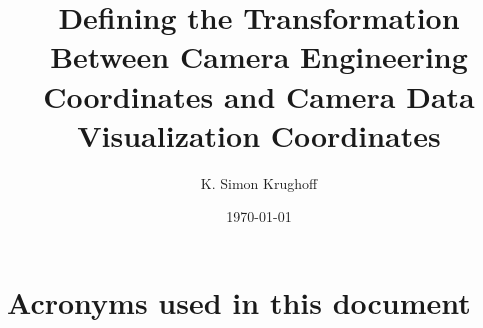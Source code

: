 \documentclass[SE,toc]{lsstdoc}
\title{Defining the Transformation Between Camera Engineering Coordinates and Camera Data Visualization Coordinates}
\author{%
K. Simon Krughoff
}
\date{\today}
\begin{document}
\maketitle





\appendix


\section{Acronyms used in this document}\label{sec:acronyms}

\end{document}
